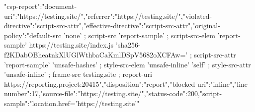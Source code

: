 {"csp-report":{"document-uri":"https://testing.site/","referrer":"https://testing.site/","violated-directive":"script-src-attr","effective-directive":"script-src-attr","original-policy":"default-src 'none' ;
script-src 'report-sample' ; script-src-elem 'report-sample' https://testing.site/index.js 'sha256-f2KDabOBheatnkXlUGlWthbaCaKmlDSpV5682oXCFAw=' ; script-src-attr 'report-sample' 'unsafe-hashes' ; style-src-elem
'unsafe-inline' 'self' ; style-src-attr 'unsafe-inline' ; frame-src testing.site ; report-uri
https://reporting.project:20415","disposition":"report","blocked-uri":"inline","line-number":17,"source-file":"https://testing.site/","status-code":200,"script-sample":"location.href='https://testing.site'"}}
